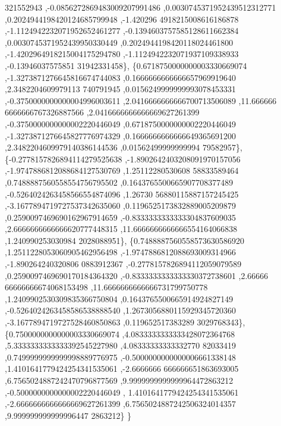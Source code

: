 \begin{DoxyCode}
      321552943 ,-0.0856272869483009207991486 ,0.0030745371952439512312771 ,0.2024944198420124685799948 ,-1.420296
      4918215008616186878 ,-1.1124942232071952652461277 ,-0.1394603757585128611662384 ,0.0030745371952439950330449
       ,0.2024944198420118024461800 ,-1.4202964918215004175294780 ,-1.1124942232071937109338933 ,-0.13946037575851
      31942331458\},
\{0.6718750000000003330669074 ,-1.3273871276645816674744083 ,0.1666666666666657969919640 ,2.3482204609979113
      740791945 ,0.0156249999999993078453331 ,-0.3750000000000004996003611 ,2.0416666666666700713506089 ,11.666666
      6666666767326887566 ,2.0416666666666669627261399 ,-0.3750000000000002220446049 ,0.6718750000000002220446049 
      ,-1.3273871276645827776974329 ,0.1666666666666649365691200 ,2.3482204609979140386144536 ,0.01562499999999994
      79582957\},
\{-0.2778157826894114279525638 ,-1.8902642403208091970157056 ,-1.9747886812088684127530769 ,1.25112280530608
      58833589464 ,0.7488887560558554756795502 ,0.1643765500665907708377489 ,-0.5264024263458566554874096 ,1.26730
      56880115887157245425 ,-3.1677894719727537342635060 ,0.1196525173832889005209879 ,0.2590097469690162967914659
       ,-0.8333333333333304837609035 ,2.6666666666666620777448315 ,11.6666666666666554164066838 ,1.240990253030984
      2028088951\},
\{0.7488887560558573630586920 ,1.2511228053060905462956498 ,-1.9747886812088693009314966 ,-1.890264240320806
      0883912367 ,-0.2778157826894112059079589 ,0.2590097469690170184364320 ,-0.8333333333333330372738601 ,2.66666
      66666666674068153498 ,11.6666666666666731799750778 ,1.2409902530309835366750804 ,0.1643765500665914924827149
       ,-0.5264024263458586538888540 ,1.2673056880115929345720360 ,-3.1677894719727528460850863 ,0.119652517383289
      3029768343\},
\{0.7500000000000003330669074 ,4.0833333333333428072364768 ,5.3333333333333392545227980 ,4.08333333333332770
      82033419 ,0.7499999999999998889776975 ,-0.5000000000000006661338148 ,1.4101641779424254341535061 ,-2.6666666
      666666651863693005 ,6.7565024887242470796877569 ,9.9999999999999964472863212 ,-0.5000000000000002220446049 ,
      1.4101641779424254341535061 ,-2.6666666666666669627261399 ,6.7565024887242506324014357 ,9.999999999999996447
      2863212\}
\}
\end{DoxyCode}
\mbox{\label{a00455_ac2a5955716f5653ee3c2b2b1e2d7bcb6}} 
